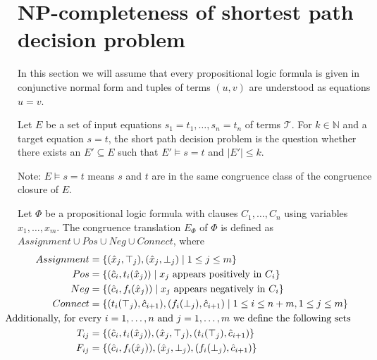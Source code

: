 \section*{NP-completeness of shortest path decision problem}

In this section we will assume that every propositional logic formula is given in conjunctive normal form and tuples of terms $(u,v)$ are understood as equations $u = v$.

\begin{definition}

Let $E$ be a set of input equations $s_1 = t_1,\ldots,s_n = t_n$ of terms $\mathcal{T}$.
For $k \in \mathbb{N}$ and a target equation $s = t$, the short path decision problem is the question whether there exists an $E' \subseteq E$ such that $E' \models s = t$ and $|E'| \leq k$.

\end{definition}

Note: $E \models s = t$ means $s$ and $t$ are in the same congruence class of the congruence closure of $E$.

\begin{definition}

Let $\Phi$ be a propositional logic formula with clauses $C_1,\ldots,C_n$ using variables $x_1,\ldots,x_m$.
The congruence translation $E_{\Phi}$ of $\Phi$ is defined as $Assignment \cup Pos \cup Neg \cup Connect$, where
\begin{align*}
	Assignment &= \{ (\hat{x}_j,\top_j), (\hat{x}_j,\bot_j) \mid 1 \leq j \leq m\} \\
	Pos &= \{ (\hat{c}_i, t_i(\hat{x}_j)) \mid x_j \text{ appears positively in } C_i\} \\
	Neg &= \{ (\hat{c}_i, f_i(\hat{x}_j)) \mid x_j \text{ appears negatively in } C_i\} \\
	Connect &= \{ (t_i(\top_j),\hat{c}_{i+1}),(f_i(\bot_j), \hat{c}_{i+1}) \mid 1 \leq i \leq n+m, 1 \leq j \leq m\} \\
&\hspace{-3cm}\text{Additionally, for every $i = 1,\ldots, n$ and $j = 1,\ldots, m$ we define the following sets }\\
T_{ij} &= \{(\hat{c}_i, t_i(\hat{x}_j)), (\hat{x}_j,\top_j), (t_i(\top_j),\hat{c}_{i+1})\} \\
F_{ij} &= \{(\hat{c}_i, f_i(\hat{x}_j)), (\hat{x}_j,\bot_j), (f_i(\bot_j),\hat{c}_{i+1})\}
\end{align*}

\end{definition}

